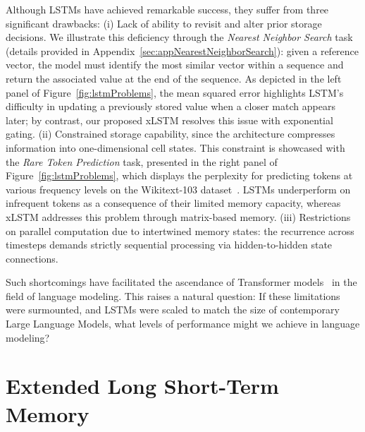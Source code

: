 Although LSTMs have achieved remarkable success, they suffer from three significant drawbacks: (i) Lack of ability to revisit and alter prior storage decisions. We illustrate this deficiency through the {\it Nearest Neighbor Search} task (details provided in Appendix~\ref{sec:appNearestNeighborSearch}): given a reference vector, the model must identify the most similar vector within a sequence and return the associated value at the end of the sequence. As depicted in the left panel of Figure~\ref{fig:lstmProblems}, the mean squared error highlights LSTM's difficulty in updating a previously stored value when a closer match appears later; by contrast, our proposed xLSTM resolves this issue with exponential gating. (ii) Constrained storage capability, since the architecture compresses information into one-dimensional cell states. This constraint is showcased with the {\it Rare Token Prediction} task, presented in the right panel of Figure~\ref{fig:lstmProblems}, which displays the perplexity for predicting tokens at various frequency levels on the Wikitext-103 dataset~\citep{Merity:17}. LSTMs underperform on infrequent tokens as a consequence of their limited memory capacity, whereas xLSTM addresses this problem through matrix-based memory. (iii) Restrictions on parallel computation due to intertwined memory states: the recurrence across timesteps demands strictly sequential processing via hidden-to-hidden state connections.

Such shortcomings have facilitated the ascendance of Transformer models~\citep{Vaswani:17} in the field of language modeling. This raises a natural question: If these limitations were surmounted, and LSTMs were scaled to match the size of contemporary Large Language Models, what levels of performance might we achieve in language modeling?

\section{Extended Long Short-Term Memory}
\label{sec:xLSTM}


